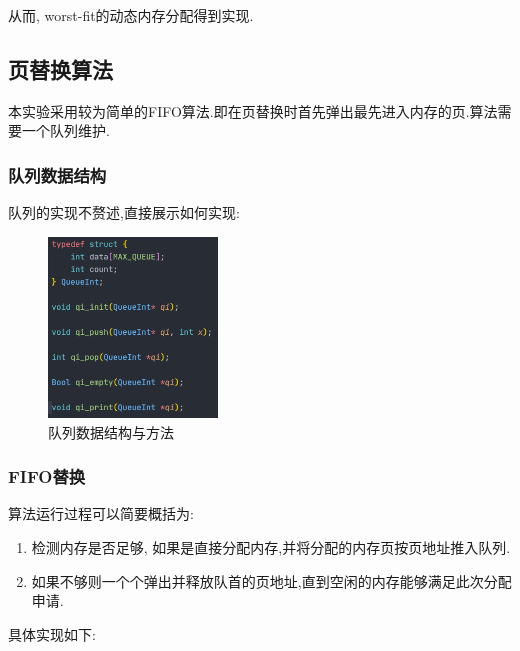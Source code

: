 从而, worst-fit的动态内存分配得到实现.

\subsection{页替换算法}

本实验采用较为简单的FIFO算法.即在页替换时首先弹出最先进入内存的页.算法需要一个队列维护.

\subsubsection{队列数据结构}

队列的实现不赘述,直接展示如何实现:

\begin{figure}[H]
    \centering
    \includegraphics[width=0.4\textwidth]{figures/queue.png}
    \caption{队列数据结构与方法}
    \label{fig:my_label}
\end{figure}

\subsubsection{FIFO替换}

算法运行过程可以简要概括为:

\begin{enumerate}[itemindent=1em]
    \item 检测内存是否足够, 如果是直接分配内存,并将分配的内存页按页地址推入队列.
    \item 如果不够则一个个弹出并释放队首的页地址,直到空闲的内存能够满足此次分配申请.
\end{enumerate}

具体实现如下:

